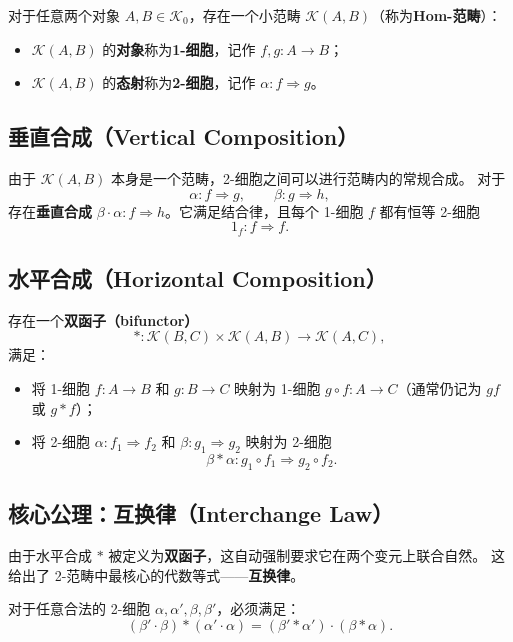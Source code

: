 \documentclass[12pt,a4paper]{ctexart}
\theoremstyle{definition}
\begin{document}
对于任意两个对象 $A, B \in \mathcal{K}_0$，存在一个小范畴 $\mathcal{K}(A, B)$（称为\textbf{Hom-范畴}）：
\begin{itemize}[leftmargin=*]
    \item $\mathcal{K}(A, B)$ 的\textbf{对象}称为\textbf{1-细胞}，记作 $f, g: A \to B$；
    \item $\mathcal{K}(A, B)$ 的\textbf{态射}称为\textbf{2-细胞}，记作 $\alpha: f \Rightarrow g$。
\end{itemize}

\subsection{垂直合成（Vertical Composition）}

由于 $\mathcal{K}(A, B)$ 本身是一个范畴，2-细胞之间可以进行范畴内的常规合成。
对于
\[
\alpha: f \Rightarrow g,\qquad \beta: g \Rightarrow h,
\]
存在\textbf{垂直合成} $\beta \cdot \alpha: f \Rightarrow h$。它满足结合律，且每个 1-细胞 $f$ 都有恒等 2-细胞
\[
1_f: f \Rightarrow f.
\]

\subsection{水平合成（Horizontal Composition）}

存在一个\textbf{双函子（bifunctor）}
\[
\ast: \mathcal{K}(B, C) \times \mathcal{K}(A, B) \longrightarrow \mathcal{K}(A, C),
\]
满足：
\begin{itemize}[leftmargin=*]
    \item 将 1-细胞 $f: A \to B$ 和 $g: B \to C$ 映射为 1-细胞 $g \circ f: A \to C$（通常仍记为 $gf$ 或 $g \ast f$）；
    \item 将 2-细胞 $\alpha: f_1 \Rightarrow f_2$ 和 $\beta: g_1 \Rightarrow g_2$ 映射为 2-细胞
    \[
    \beta \ast \alpha: g_1 \circ f_1 \Rightarrow g_2 \circ f_2.
    \]
\end{itemize}

\subsection{核心公理：互换律（Interchange Law）}

由于水平合成 $\ast$ 被定义为\textbf{双函子}，这自动强制要求它在两个变元上联合自然。
这给出了 2-范畴中最核心的代数等式——\textbf{互换律}。

对于任意合法的 2-细胞 $\alpha, \alpha', \beta, \beta'$，必须满足：
\begin{equation}\label{eq:interchange}
(\beta' \cdot \beta) \ast (\alpha' \cdot \alpha) = (\beta' \ast \alpha') \cdot (\beta \ast \alpha).
\end{equation}
\end{document}
